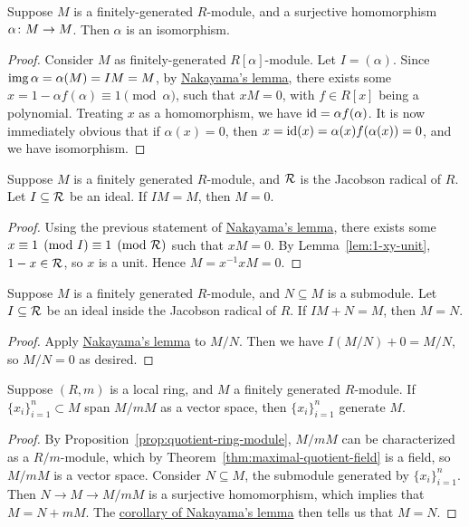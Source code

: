 \begin{corollary}
    Suppose \(M\) is a finitely-generated \(R\)-module,
    and a surjective homomorphism \(\alpha\colon M\to M\).
    Then \(\alpha\) is an isomorphism.
\end{corollary}
\begin{proof}
    Consider \(M\) as finitely-generated \(R[\alpha]\)-module.
    Let \(I = (\alpha)\).
    Since \(\operatorname{img}\alpha = \alpha(M) = IM = M\),
    by \hyperref[cor:nakayama]{Nakayama's lemma},
    there exists some \(x = 1 - \alpha f(\alpha) \equiv 1 \pmod{\alpha}\),
    such that \(xM = 0\), with \(f \in R[x]\) being a polynomial.
    Treating \(x\) as a homomorphism,
    we have \(\operatorname{id} = \alpha f(\alpha)\).
    It is now immediately obvious that if \(\alpha(x) = 0\),
    then \(x = \operatorname{id}(x) = \alpha(x) f(\alpha(x)) = 0\),
    and we have isomorphism.
\end{proof}

\begin{theorem}\label{thm:nakayama}
    Suppose \(M\) is a finitely generated \(R\)-module,
    and \(\mathcal{R}\) is the Jacobson radical of \(R\).
    Let \(I \subseteq \mathcal{R}\) be an ideal.
    If \(IM = M\), then \(M = 0\).
\end{theorem}
\begin{proof}
    Using the previous statement of \hyperref[cor:nakayama]{Nakayama's lemma},
    there exists some \(x \equiv 1 \pmod{I} \equiv 1 \pmod{\mathcal{R}}\)
    such that \(xM = 0\).
    By Lemma~\ref{lem:1-xy-unit}, \(1-x \in \mathcal{R}\), so \(x\) is a unit.
    Hence \(M = x^{-1}xM = 0\).
\end{proof}
\begin{corollary}\label{cor:nakayama-quotient}
    Suppose \(M\) is a finitely generated \(R\)-module,
    and \(N \subseteq M\) is a submodule.
    Let \(I \subseteq \mathcal{R}\) be an ideal inside the Jacobson radical of \(R\).
    If \(IM + N = M\), then \(M = N\).
\end{corollary}
\begin{proof}
    Apply \hyperref[thm:nakayama]{Nakayama's lemma} to \(M/N\).
    Then we have \(I(M/N) + 0 = M/N\),
    so \(M/N = 0\) as desired.
\end{proof}

\begin{theorem}
    Suppose \((R,m)\) is a local ring,
    and \(M\) a finitely generated \(R\)-module.
    If \({\{x_i\}}_{i=1}^n \subset M\) span \(M/mM\) as a vector space,
    then \({\{x_i\}}_{i=1}^n\) generate \(M\).
\end{theorem}
\begin{proof}
    By Proposition~\ref{prop:quotient-ring-module},
    \(M/mM\) can be characterized as a \(R/m\)-module,
    which by Theorem~\ref{thm:maximal-quotient-field} is a field,
    so \(M/mM\) is a vector space.
    Consider \(N \subseteq M\), the submodule generated by \({\{x_i\}}_{i=1}^n\).
    Then \(N \to M \to M/mM\) is a surjective homomorphism,
    which implies that \(M = N + mM\).
    The \hyperref[cor:nakayama-quotient]{corollary of Nakayama's lemma}
    then tells us that \(M = N\).
\end{proof}


